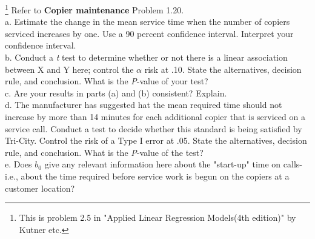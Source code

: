 \documentclass[12pt]{article}
\begin{document}
 {\footnote[1]{This is
problem 2.5 in "Applied Linear Regression Models(4th edition)" by
Kutner etc.} 
 Refer to \textbf{Copier maintenance} Problem 1.20.\\
 a. Estimate the change in the mean service time when the number of copiers serviced increases by one. Use a 90 percent confidence interval. Interpret your confidence interval.\\
 b. Conduct a \textit{t} test to determine whether or not there is a linear association between X and Y here; control the $\alpha$ risk at .10. State the alternatives, decision rule, and conclusion. What is the \textit{P}-value of your test?\\
 c. Are your results in parts (a) and (b) consistent? Explain.\\
 d. The manufacturer has suggested hat the mean required time should not increase by more than 14 minutes for each additional copier that is serviced on a service call. Conduct a test to decide whether this standard is being satisfied by Tri-City. Control the risk of a Type I error at .05. State the alternatives, decision rule, and conclusion. What is the \textit{P}-value of the test?\\
 e. Does $b_0$ give any relevant information here about the "start-up" time on calls-i.e., about the time required before service work is begun on the copiers at a customer location? 
   }
\end{document}
